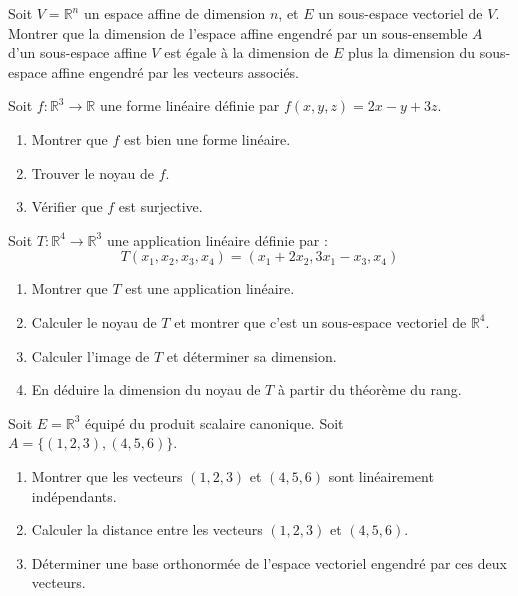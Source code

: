 \begin{exercice}
Soit \( V = \mathbb{R}^n \) un espace affine de dimension \( n \), et \( E \) un sous-espace vectoriel de \( V \). Montrer que la dimension de l'espace affine engendré par un sous-ensemble \( A \) d'un sous-espace affine \( V \) est égale à la dimension de \( E \) plus la dimension du sous-espace affine engendré par les vecteurs associés.
\end{exercice}

\begin{exercice}
Soit \( f : \mathbb{R}^3 \to \mathbb{R} \) une forme linéaire définie par \( f(x, y, z) = 2x - y + 3z \). 
\begin{enumerate}
    \item Montrer que \( f \) est bien une forme linéaire.
    \item Trouver le noyau de \( f \).
    \item Vérifier que \( f \) est surjective.
\end{enumerate}
\end{exercice}

\begin{exercice}
Soit \( T : \mathbb{R}^4 \to \mathbb{R}^3 \) une application linéaire définie par :
\[
T(x_1, x_2, x_3, x_4) = (x_1 + 2x_2, 3x_1 - x_3, x_4)
\]
\begin{enumerate}
    \item Montrer que \( T \) est une application linéaire.
    \item Calculer le noyau de \( T \) et montrer que c'est un sous-espace vectoriel de \( \mathbb{R}^4 \).
    \item Calculer l'image de \( T \) et déterminer sa dimension.
    \item En déduire la dimension du noyau de \( T \) à partir du théorème du rang.
\end{enumerate}
\end{exercice}

\begin{exercice}
Soit \( E = \mathbb{R}^3 \) équipé du produit scalaire canonique. Soit \( A = \{(1, 2, 3), (4, 5, 6)\} \).
\begin{enumerate}
    \item Montrer que les vecteurs \( (1, 2, 3) \) et \( (4, 5, 6) \) sont linéairement indépendants.
    \item Calculer la distance entre les vecteurs \( (1, 2, 3) \) et \( (4, 5, 6) \).
    \item Déterminer une base orthonormée de l'espace vectoriel engendré par ces deux vecteurs.
\end{enumerate}
\end{exercice}

